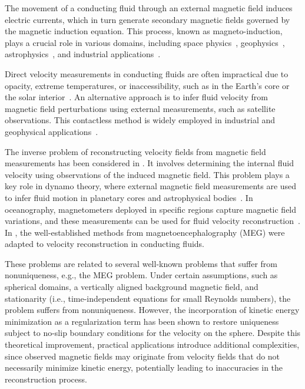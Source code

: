 \documentclass[12pt]{article}
\begin{document}
	
	
	The movement of a conducting fluid through an external magnetic field induces electric currents, which in turn generate secondary magnetic fields governed by the magnetic induction equation.  This process, known as magneto-induction, plays a crucial role in various domains, including space physics~\cite{ruderman2010stability,parks2004space}, geophysics~\cite{weaver1965magnetic,podney1975electromagnetic}, astrophysics~\cite{oughton2017reduced,gomez2005mhd}, and industrial applications~\cite{gregory2016magnetohydrodynamic,dzelme2018numerical}.  
	
	Direct velocity measurements in conducting fluids are often impractical due to opacity, extreme temperatures, or inaccessibility, such as in the Earth's core or the solar interior~\cite{wicht2010theory,jones2010solar}. An alternative approach is to infer fluid velocity from magnetic field perturbations using external measurements, such as satellite observations. This contactless method is widely employed in industrial and geophysical applications~\cite{stefani2004contactless,lehtikangas2016reconstruction,evans2022internal}.  
	
	
	
	The inverse problem of reconstructing velocity fields from magnetic field measurements has been considered in \cite{lehtikangas2016reconstruction,stefani1999velocity,stefani2000uniqueness,stefani2012inverse}. It involves determining the internal fluid velocity using observations of the induced magnetic field. This problem plays a key role in dynamo theory, where external magnetic field measurements are used to infer fluid motion in planetary cores and astrophysical bodies~\cite{stefani2012inverse}. In oceanography, magnetometers deployed in specific regions capture magnetic field variations, and these measurements can be used for fluid velocity reconstruction~\cite{evans2022internal}. In \cite{stefani1999velocity},  the well-established methods from magnetoencephalography (MEG) \cite{hamalainen1993magnetoencephalography,fokas1996inversion} were adapted to velocity reconstruction in conducting fluids.

    
	These problems are related to several well-known problems that suffer from nonuniqueness, e.g., the MEG problem. Under certain assumptions, such as spherical domains, a vertically aligned background magnetic field, and stationarity (i.e., time-independent equations for small Reynolds numbers), the problem suffers from nonuniqueness. However, the incorporation of kinetic energy minimization as a regularization term has been shown to restore uniqueness~\cite{stefani2000uniqueness,stefani2012inverse} subject to no-slip boundary conditions for the velocity on the sphere. Despite this theoretical improvement, practical applications introduce additional complexities, since observed magnetic fields may originate from velocity fields that do not necessarily minimize kinetic energy, potentially leading to inaccuracies in the reconstruction process. 
\end{document}
